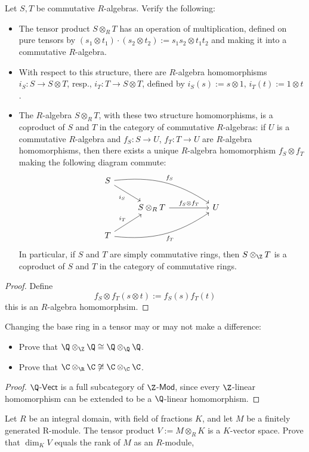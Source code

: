 \begin{exercise}
Let $S,T$ be commutative $R$-algebras. Verify the following:
\begin{itemize}
\item The tensor product $S\otimes_{R}T$ has an operation of multiplication, defined on pure tensors by $(s_1\otimes t_1)\cdot(s_2\otimes t_2):=s_1s_2\otimes t_1t_2$ and making it into a commutative $R$-algebra.
\item With respect to this structure, there are $R$-algebra homomorphisms $i_S:S\to S\otimes T$, resp., $i_T:T\to S\otimes T$, defined by $i_S(s):=s\otimes1$, $i_T(t):=1\otimes t$.
\item The $R$-algebra $S\otimes_{R}T$, with these two structure homomorphisms, is a coproduct of $S$ and $T$ in the category of commutative $R$-algebras: if $U$ is a commutative $R$-algebra and $f_S:S\to U$, $f_T:T\to U$ are $R$-algebra homomorphisms, then there exists a unique $R$-algebra homomorphism $f_S\otimes f_T$ making the following diagram commute:
\[\begin{tikzcd}
S\ar[rd,swap,"i_S"]\ar[rrrd,bend left=20,"f_S"]&&\\
&S\otimes_{R}T\ar[rr,"f_S\otimes f_T"]&&U\\
T\ar[ru,"i_T"]\ar[rrru,swap,bend right=20,"f_T"]
\end{tikzcd}\]
In particular, if $S$ and $T$ are simply commutative rings, then $S\otimes_{\Z}T$ is a coproduct of $S$ and $T$ in the category of commutative rings.
\end{itemize}
\begin{proof}
Define
\[f_S\otimes f_T(s\otimes t):=f_S(s)f_T(t)\]
this is an $R$-algebra homomorphsim.
\end{proof}
\end{exercise}
\begin{exercise}
Changing the base ring in a tensor may or may not make a difference:
\begin{itemize}
\item Prove that $\Q\otimes_{\Z}\Q\cong\Q\otimes_{\Q}\Q$.
\item Prove that $\C\otimes_{\R}\C\not\cong\C\otimes_{\C}\C$.
\end{itemize}
\end{exercise}
\begin{proof}
$\Q$-$\mathsf{Vect}$ is a full subcategory of $\Z$-$\mathsf{Mod}$, since every $\Z$-linear homomorphism can be extended to be a $\Q$-linear homomorphism.
\end{proof}
\begin{exercise}
Let $R$ be an integral domain, with field of fractions $K$, and let $M$ be a finitely generated R-module. The tensor product $V:= M\otimes_{R}K$ is a $K$-vector space. Prove that $\dim_KV$ equals the rank of $M$ as an $R$-module,
\end{exercise}
